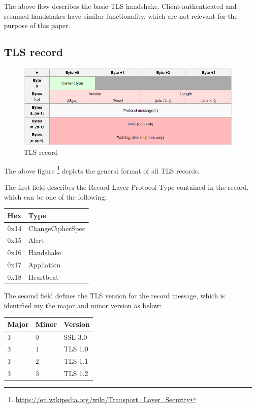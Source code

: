 The above flow describes the basic TLS handshake. Client-authenticated and
resumed handshakes have similar functionality, which are not relevant for the
purpose of this paper.

\subsection{TLS record}

\begin{figure}[H] \caption{TLS record} \centering
\includegraphics[width=1\textwidth]{diagrams/tls_record.png}\end{figure}

The above figure
\footnote{\url{https://en.wikipedia.org/wiki/Transport_Layer_Security}} depicts
the general format of all TLS records.

The first field describes the Record Layer Protocol Type contained in the
record, which can be one of the following:

\begin{table}[H] \centering \begin{tabular}{ | l | l | } \hline \textbf{Hex} &
\textbf{Type} \\ \hline 0x14 & ChangeCipherSpec \\ 0x15 & Alert \\ 0x16 &
Handshake \\ 0x17 & Appliation \\ 0x18 & Heartbeat \\ \hline \end{tabular}
\end{table}

The second field defines the TLS version for the record message, which is
identified my the major and minor version as below:

\begin{table}[H] \centering \begin{tabular}{ | l | l | l | } \hline
\textbf{Major} & \textbf{Minor} & \textbf{Version} \\ \hline 3 & 0 & SSL 3.0 \\
3 & 1 & TLS 1.0 \\ 3 & 2 & TLS 1.1 \\ 3 & 3 & TLS 1.2 \\ \hline \end{tabular}
\end{table}

